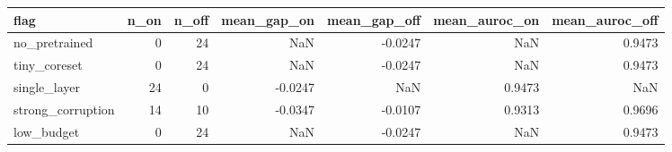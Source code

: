\begin{tabular}{lrrrrrr}
\toprule
             flag &  n\_on &  n\_off &  mean\_gap\_on &  mean\_gap\_off &  mean\_auroc\_on &  mean\_auroc\_off \\
\midrule
    no\_pretrained &     0 &     24 &          NaN &       -0.0247 &            NaN &          0.9473 \\
     tiny\_coreset &     0 &     24 &          NaN &       -0.0247 &            NaN &          0.9473 \\
     single\_layer &    24 &      0 &      -0.0247 &           NaN &         0.9473 &             NaN \\
strong\_corruption &    14 &     10 &      -0.0347 &       -0.0107 &         0.9313 &          0.9696 \\
       low\_budget &     0 &     24 &          NaN &       -0.0247 &            NaN &          0.9473 \\
\bottomrule
\end{tabular}
